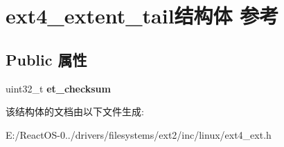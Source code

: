\hypertarget{structext4__extent__tail}{}\section{ext4\+\_\+extent\+\_\+tail结构体 参考}
\label{structext4__extent__tail}
\subsection*{Public 属性}
\begin{DoxyCompactItemize}
\item 
\mbox{\label{structext4__extent__tail_a116c64951b48c2ae187bc4f604e2fc03}} 
uint32\+\_\+t {\bfseries et\+\_\+checksum}
\end{DoxyCompactItemize}


该结构体的文档由以下文件生成\+:\begin{DoxyCompactItemize}
\item 
E\+:/\+React\+O\+S-\/0../drivers/filesystems/ext2/inc/linux/ext4\+\_\+ext.\+h\end{DoxyCompactItemize}
